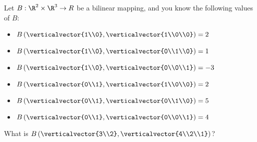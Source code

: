 \documentclass{ximera}
\begin{document}
	\begin{question}
		Let  $B:\R^2 \times \R^3 \to R$ be a bilinear mapping, and you know the following values of $B$:
			\begin{itemize}
				\item $B\left(\verticalvector{1\\0},\verticalvector{1\\0\\0}\right) = 2$
				\item $B\left(\verticalvector{1\\0},\verticalvector{0\\1\\0}\right) = 1$
				\item $B\left(\verticalvector{1\\0},\verticalvector{0\\0\\1}\right) = -3$
				\item $B\left(\verticalvector{0\\1},\verticalvector{1\\0\\0}\right) = 2$
				\item $B\left(\verticalvector{0\\1},\verticalvector{0\\1\\0}\right) = 5$
				\item $B\left(\verticalvector{0\\1},\verticalvector{0\\0\\1}\right) = 4$ 
			\end{itemize}
			
			What is $B\left(\verticalvector{3\\2},\verticalvector{4\\2\\1}\right)$?
			

\end{question}
\end{document}
